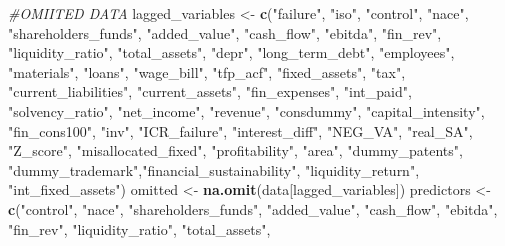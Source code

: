 \documentclass[]{article}
\newenvironment{Shaded}{\begin{snugshade}}{\end{snugshade}}
\newcommand{\CommentTok}[1]{\textcolor[rgb]{0.56,0.35,0.01}{\textit{#1}}}
\newcommand{\KeywordTok}[1]{\textcolor[rgb]{0.13,0.29,0.53}{\textbf{#1}}}
\newcommand{\NormalTok}[1]{#1}
\newcommand{\StringTok}[1]{\textcolor[rgb]{0.31,0.60,0.02}{#1}}
\begin{document}
\begin{Shaded}
\begin{Highlighting}[]
\CommentTok{#OMIITED DATA}
\NormalTok{lagged_variables <-}\StringTok{ }\KeywordTok{c}\NormalTok{(}\StringTok{"failure"}\NormalTok{, }\StringTok{"iso"}\NormalTok{, }\StringTok{"control"}\NormalTok{, }\StringTok{"nace"}\NormalTok{,}
                      \StringTok{"shareholders_funds"}\NormalTok{, }\StringTok{"added_value"}\NormalTok{,}
                      \StringTok{"cash_flow"}\NormalTok{, }\StringTok{"ebitda"}\NormalTok{, }\StringTok{"fin_rev"}\NormalTok{,}
                      \StringTok{"liquidity_ratio"}\NormalTok{, }\StringTok{"total_assets"}\NormalTok{,}
                      \StringTok{"depr"}\NormalTok{, }\StringTok{"long_term_debt"}\NormalTok{, }\StringTok{"employees"}\NormalTok{,}
                      \StringTok{"materials"}\NormalTok{, }\StringTok{"loans"}\NormalTok{, }\StringTok{"wage_bill"}\NormalTok{,}
                      \StringTok{"tfp_acf"}\NormalTok{, }\StringTok{"fixed_assets"}\NormalTok{, }\StringTok{"tax"}\NormalTok{,}
                      \StringTok{"current_liabilities"}\NormalTok{, }\StringTok{"current_assets"}\NormalTok{,}
                      \StringTok{"fin_expenses"}\NormalTok{, }\StringTok{"int_paid"}\NormalTok{,}
                      \StringTok{"solvency_ratio"}\NormalTok{, }\StringTok{"net_income"}\NormalTok{,}
                      \StringTok{"revenue"}\NormalTok{, }\StringTok{"consdummy"}\NormalTok{, }\StringTok{"capital_intensity"}\NormalTok{,}
                      \StringTok{"fin_cons100"}\NormalTok{, }\StringTok{"inv"}\NormalTok{, }\StringTok{"ICR_failure"}\NormalTok{,}
                      \StringTok{"interest_diff"}\NormalTok{, }\StringTok{"NEG_VA"}\NormalTok{, }\StringTok{"real_SA"}\NormalTok{,}
                      \StringTok{"Z_score"}\NormalTok{, }\StringTok{"misallocated_fixed"}\NormalTok{,}
                      \StringTok{"profitability"}\NormalTok{, }\StringTok{"area"}\NormalTok{, }\StringTok{"dummy_patents"}\NormalTok{,}
                      \StringTok{"dummy_trademark"}\NormalTok{,}\StringTok{"financial_sustainability"}\NormalTok{,}
                      \StringTok{"liquidity_return"}\NormalTok{, }\StringTok{"int_fixed_assets"}\NormalTok{)}
\NormalTok{omitted <-}\StringTok{ }\KeywordTok{na.omit}\NormalTok{(data[lagged_variables])}
\NormalTok{predictors <-}\StringTok{ }\KeywordTok{c}\NormalTok{(}\StringTok{"control"}\NormalTok{, }\StringTok{"nace"}\NormalTok{, }\StringTok{"shareholders_funds"}\NormalTok{,}
                \StringTok{"added_value"}\NormalTok{, }\StringTok{"cash_flow"}\NormalTok{, }\StringTok{"ebitda"}\NormalTok{,}
                \StringTok{"fin_rev"}\NormalTok{, }\StringTok{"liquidity_ratio"}\NormalTok{, }\StringTok{"total_assets"}\NormalTok{,}

\end{Highlighting}
\end{Shaded}
\end{document}
